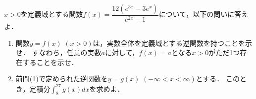 \documentclass[../../main.tex]{subfiles}
\begin{document}
$x>0$を定義域とする関数$\displaystyle f(x)=\dfrac{12(e^{3x}-3e^x)}{e^{2x}-1}$について，以下の問いに答えよ．
\begin{enumerate}
  \item 関数$y=f(x)$ $(x>0)$は，実数全体を定義域とする逆関数を持つことを示せ．
    すなわち，任意の実数$a$に対して，$f(x)=a$となる$x>0$がただ1つ存在することを示せ．
  \item 前問(1)で定められた逆関数を$y=g(x)$ $(-\infty<x<\infty)$とする．
    このとき，定積分$\displaystyle\int_8^{27}g(x)dx$を求めよ．
\end{enumerate}
\end{document}
